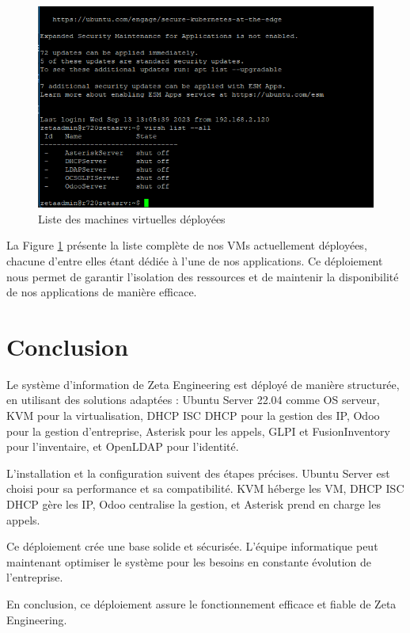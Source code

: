 \begin{figure}[H]
\centering
\includegraphics[width=15cm]{Images/virsh-listall.png}
\caption{Liste des machines virtuelles déployées}
\label{fig:vm-list}
\end{figure}

La Figure \ref{fig:vm-list} présente la liste complète de nos VMs actuellement déployées, chacune d'entre elles étant dédiée à l'une de nos applications. Ce déploiement nous permet de garantir l'isolation des ressources et de maintenir la disponibilité de nos applications de manière efficace.



\section{Conclusion}

Le système d'information de Zeta Engineering est déployé de manière structurée, en utilisant des solutions adaptées : Ubuntu Server 22.04 comme OS serveur, KVM pour la virtualisation, DHCP ISC DHCP pour la gestion des IP, Odoo pour la gestion d'entreprise, Asterisk pour les appels, GLPI et FusionInventory pour l'inventaire, et OpenLDAP pour l'identité.

L'installation et la configuration suivent des étapes précises. Ubuntu Server est choisi pour sa performance et sa compatibilité. KVM héberge les VM, DHCP ISC DHCP gère les IP, Odoo centralise la gestion, et Asterisk prend en charge les appels.

Ce déploiement crée une base solide et sécurisée. L'équipe informatique peut maintenant optimiser le système pour les besoins en constante évolution de l'entreprise.

En conclusion, ce déploiement assure le fonctionnement efficace et fiable de Zeta Engineering.